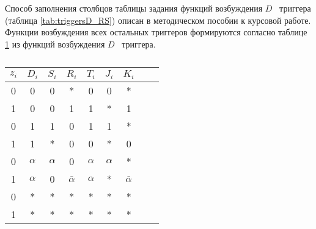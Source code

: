 \documentclass[a4paper,14pt,russian]{extarticle} %
\begin{document}
Способ заполнения столбцов таблицы задания функций возбуждения \(D\) \textendash\ триггера (таблица \ref{tab:triggersD_RS}) описан в методическом пособии к курсовой работе. Функции возбуждения всех остальных триггеров формируются согласно таблице \ref{tab:triggersConversion}  из функций возбуждения \(D\) \textendash\ триггера.

\begin{table}[H]
	\centering
	\begin{threeparttable}	
		\caption{}	
		\renewcommand{\arraystretch}{0.7}
		\renewcommand{\tabcolsep}{0.7em}	
		\label{tab:triggersConversion} 
		\begin{tabular}{|c|c|c|c|c|c|c|c|c|}
			\hline
			\(z_i\) & \(D_i\) & \(S_i\) & \(R_i\) & \(T_i\) & \(J_i\) & \(K_i\)\\ \hline
			0 & 0 & 0 & * & 0 & 0 & * \\ \hline
			1 & 0 & 0 & 1 & 1 & * & 1 \\ \hline
			0 & 1 & 1 & 0 & 1 & 1 & * \\ \hline
			1 & 1 & * & 0 & 0 & * & 0 \\ \hline
			0 & \(\alpha\) & \(\alpha\) & 0 & \(\alpha\) & \(\alpha\) & * \\ \hline
			1 & \(\alpha\) & 0 & \(\bar{\alpha}\) & \(\alpha\) & * & \(\bar{\alpha}\) \\ \hline
			0 & * & * & * & * & * & * \\ \hline
			1 & * & * & * & * & * & * \\ \hline
		\end{tabular}
	\end{threeparttable}
\end{table}	
\end{document}
